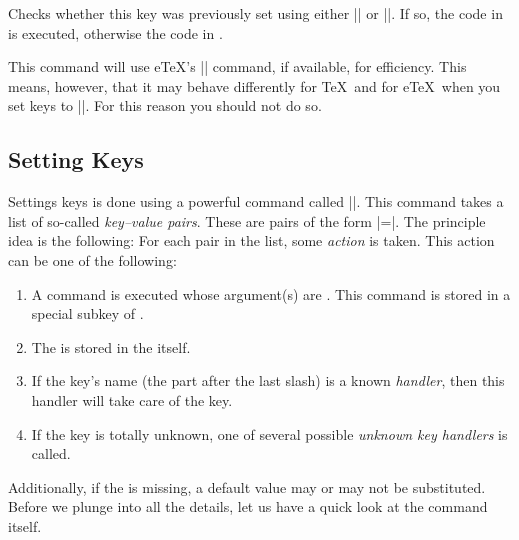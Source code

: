 \begin{command}{\pgfkeysifdefined{}}
  Checks whether this key was previously set using either
  |\pgfkeyssetvalue| or |\pgfkeyslet|. If so, the code in  is
  executed, otherwise the code in .

  This command will use e\TeX's |\ifcsname| command, if available, for
  efficiency. This means, however, that it may behave differently for
  \TeX\ and for e\TeX\ when you set keys to |\relax|. For this reason
  you should not do so.
\begin{codeexample}[]
\end{codeexample}
\end{command}


\subsection{Setting Keys}

Settings keys is done using a powerful command called |\pgfkeys|. This
command takes a list of so-called \emph{key--value pairs}. These are
pairs of the form |=|. The principle idea is the
following: For each pair in the list, some \emph{action} is
taken. This action can be one of the following:

\begin{enumerate}
\item A command is executed whose argument(s) are . This
  command is stored in a special subkey of .
\item The  is stored in the  itself.
\item If the key's name (the part after the last slash) is a known
  \emph{handler}, then this handler will take care of the key.
\item If the key is totally unknown, one of several possible
  \emph{unknown key handlers} is called.
\end{enumerate}

Additionally, if the  is missing, a default value may or
may not be substituted. Before we plunge into all the details,
let us have a quick look at the command itself.

